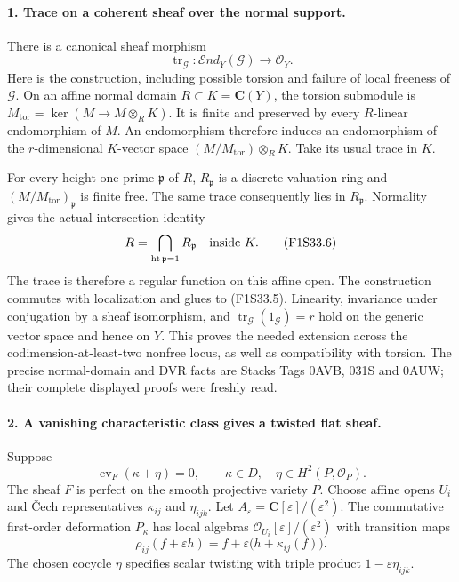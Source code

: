 \paragraph{1. Trace on a coherent sheaf over the normal support.}
There is a canonical sheaf morphism
\[
 \operatorname{tr}_{\mathcal G}:
          \mathcal End_Y(\mathcal G)\longrightarrow\mathcal O_Y.
 \tag{F1S33.5}
\]
Here is the construction, including possible torsion
and failure of local freeness of $\mathcal G$.
On an affine normal domain $R\subset K=\mathbf C(Y)$,
the torsion submodule is
$M_{\mathrm{tor}}=\ker(M\to M\otimes_RK)$.
It is finite and preserved by every $R$-linear
endomorphism of $M$.
An endomorphism therefore induces an endomorphism of
the $r$-dimensional $K$-vector space
$(M/M_{\mathrm{tor}})\otimes_RK$.
Take its usual trace in $K$.

For every height-one prime $\mathfrak p$ of $R$,
$R_{\mathfrak p}$ is a discrete valuation ring and
$(M/M_{\mathrm{tor}})_{\mathfrak p}$ is finite free.
The same trace consequently lies in $R_{\mathfrak p}$.
Normality gives the actual intersection identity
\[
             R=\bigcap_{\operatorname{ht}\mathfrak p=1}
                        R_{\mathfrak p}\quad\hbox{inside }K.
 \tag{F1S33.6}
\]
The trace is therefore a regular function on this
affine open. The construction commutes with
localization and glues to (F1S33.5).
Linearity, invariance under conjugation by a sheaf
isomorphism, and
$\operatorname{tr}_{\mathcal G}(1_{\mathcal G})=r$
hold on the generic vector space and hence on $Y$.
This proves the needed extension across the
codimension-at-least-two nonfree locus, as well as
compatibility with torsion.
The precise normal-domain and DVR facts are
Stacks Tags 0AVB, 031S and 0AUW; their complete
displayed proofs were freshly read.

\paragraph{2. A vanishing characteristic class gives a twisted flat sheaf.}
Suppose
\[
       \operatorname{ev}_F(\kappa+\eta)=0,\qquad
       \kappa\in D,\quad \eta\in H^2(P,\mathcal O_P).
 \tag{F1S33.7}
\]
The sheaf $F$ is perfect on the smooth projective
variety $P$. Choose affine opens $U_i$ and
\v Cech representatives $\kappa_{ij}$ and
$\eta_{ijk}$. Let $A_\varepsilon=\mathbf C[\varepsilon]/
(\varepsilon^2)$.
The commutative first-order deformation $P_\kappa$
has local algebras
$\mathcal O_{U_i}[\varepsilon]/(\varepsilon^2)$
with transition maps
\[
 \rho_{ij}(f+\varepsilon h)
       =f+\varepsilon\bigl(h+\kappa_{ij}(f)\bigr).
 \tag{F1S33.8}
\]
The chosen cocycle $\eta$ specifies scalar twisting
with triple product $1-\varepsilon\eta_{ijk}$.

